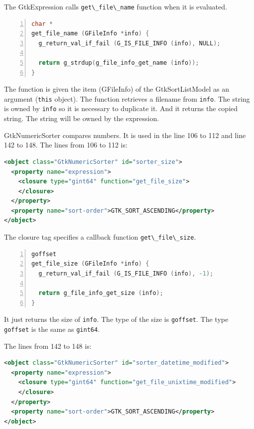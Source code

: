 The GtkExpression calls \passthrough{\lstinline!get\_file\_name!}
function when it is evaluated.

\begin{lstlisting}[language=C, numbers=left]
char *
get_file_name (GFileInfo *info) {
  g_return_val_if_fail (G_IS_FILE_INFO (info), NULL);

  return g_strdup(g_file_info_get_name (info));
}
\end{lstlisting}

The function is given the item (GFileInfo) of the GtkSortListModel as an
argument (\passthrough{\lstinline!this!} object). The function retrieves
a filename from \passthrough{\lstinline!info!}. The string is owned by
\passthrough{\lstinline!info!} so it is necessary to duplicate it. And
it returns the copied string. The string will be owned by the
expression.

GtkNumericSorter compares numbers. It is used in the line 106 to 112 and
line 142 to 148. The lines from 106 to 112 is:

\begin{lstlisting}[language=XML]
<object class="GtkNumericSorter" id="sorter_size">
  <property name="expression">
    <closure type="gint64" function="get_file_size">
    </closure>
  </property>
  <property name="sort-order">GTK_SORT_ASCENDING</property>
</object>
\end{lstlisting}

The closure tag specifies a callback function
\passthrough{\lstinline!get\_file\_size!}.

\begin{lstlisting}[language=C, numbers=left]
goffset
get_file_size (GFileInfo *info) {
  g_return_val_if_fail (G_IS_FILE_INFO (info), -1);

  return g_file_info_get_size (info);
}
\end{lstlisting}

It just returns the size of \passthrough{\lstinline!info!}. The type of
the size is \passthrough{\lstinline!goffset!}. The type
\passthrough{\lstinline!goffset!} is the same as
\passthrough{\lstinline!gint64!}.

The lines from 142 to 148 is:

\begin{lstlisting}[language=XML]
<object class="GtkNumericSorter" id="sorter_datetime_modified">
  <property name="expression">
    <closure type="gint64" function="get_file_unixtime_modified">
    </closure>
  </property>
  <property name="sort-order">GTK_SORT_ASCENDING</property>
</object>
\end{lstlisting}

